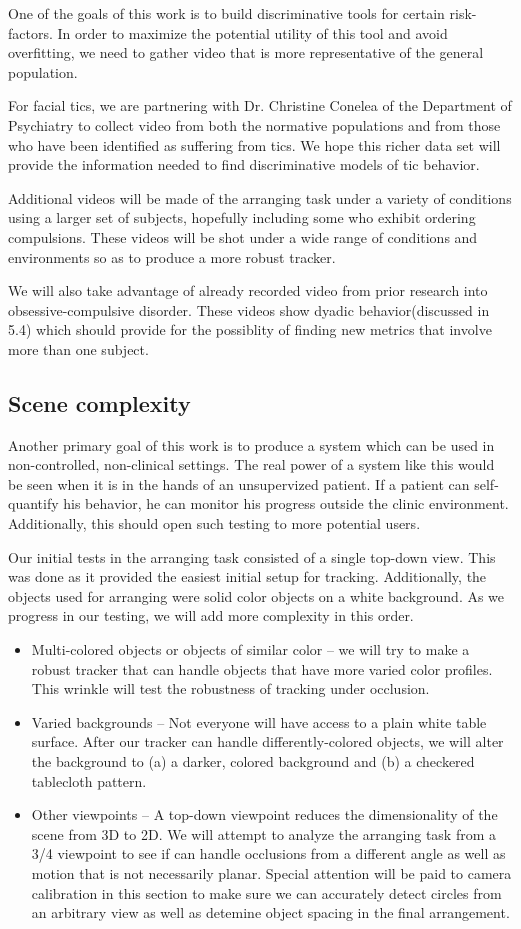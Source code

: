\documentclass[11pt]{article}
\begin{document}
One of the goals of this work is to build discriminative tools for certain risk-factors. In order to maximize the potential utility of this tool and avoid overfitting, we need to gather video that is more representative of the general population.

For facial tics, we are partnering with Dr. Christine Conelea of the Department of Psychiatry to collect video from both the normative populations and from those who have been identified as suffering from tics. We hope this richer data set will provide the information needed to find discriminative models of tic behavior.

Additional videos will be made of the arranging task under a variety of conditions using a larger set of subjects, hopefully including some who exhibit ordering compulsions. These videos will be shot under a wide range of conditions and environments so as to produce a more robust tracker.

We will also take advantage of already recorded video from prior research into obsessive-compulsive disorder. These videos show dyadic behavior(discussed in 5.4) which should provide for the possiblity of finding new metrics that involve more than one subject.
\subsection{Scene complexity}
Another primary goal of this work is to produce a system which can be used in non-controlled, non-clinical settings. The real power of a system like this would be seen when it is in the hands of an unsupervized patient. If a patient can self-quantify his behavior, he can monitor his progress outside the clinic environment. Additionally, this should open such testing to more potential users.

Our initial tests in the arranging task consisted of a single top-down view. This was done as it provided the easiest initial setup for tracking. Additionally, the objects used for arranging were solid color objects on a white background. As we progress in our testing, we will add more complexity in this order.
\begin{itemize}
	\item{Multi-colored objects or objects of similar color -- we will try to make a robust tracker that can handle objects that have more varied color profiles. This wrinkle will test the robustness of tracking under occlusion.}
	\item{Varied backgrounds -- Not everyone will have access to a plain white table surface. After our tracker can handle differently-colored objects, we will alter the background to (a) a darker, colored background and (b) a checkered tablecloth pattern.}
	\item{Other viewpoints -- A top-down viewpoint reduces the dimensionality of the scene from 3D to 2D. We will attempt to analyze the arranging task from a 3/4 viewpoint to see if can handle occlusions from a different angle as well as motion that is not necessarily planar. Special attention will be paid to camera calibration in this section to make sure we can accurately detect circles from an arbitrary view as well as detemine object spacing in the final arrangement.}
\end{itemize}
\end{document}
